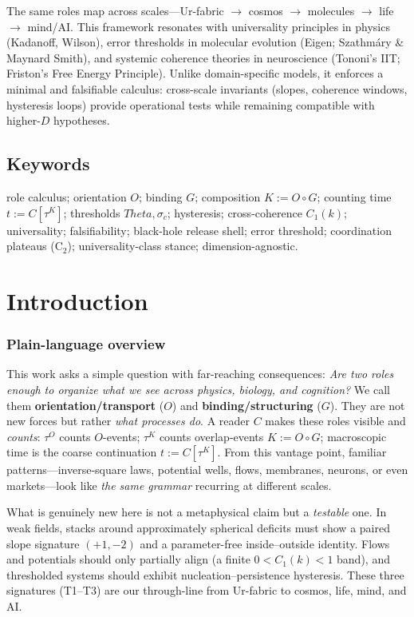 \documentclass[12pt,a4paper,oneside]{scrreprt}
\def\Theta{Theta}%
\begin{document}
The same roles map across scales—Ur-fabric $\rightarrow$ cosmos $\rightarrow$ 
molecules $\rightarrow$ life $\rightarrow$ mind/AI. This framework resonates with 
universality principles in physics (Kadanoff, Wilson), error thresholds in molecular 
evolution (Eigen; Szathmáry \& Maynard Smith), and systemic coherence theories 
in neuroscience (Tononi’s IIT; Friston’s Free Energy Principle). Unlike 
domain-specific models, it enforces a minimal and falsifiable calculus: 
cross-scale invariants (slopes, coherence windows, hysteresis loops) provide 
operational tests while remaining compatible with higher-$D$ hypotheses.

\chapter*{Keywords}
role calculus; orientation $O$; binding $G$; composition $K{:=}O\!\circ G$; 
counting time $t{:=}C[\tau^K]$; thresholds $\Theta,\sigma_c$; hysteresis; 
cross-coherence $C_1(k)$; universality; falsifiability; black-hole release shell; 
error threshold; coordination plateaus (C$_2$); universality-class stance; 
dimension-agnostic.

\tableofcontents
\listoffigures
\listoftables
\clearpage
{}

\part{Introduction}

\section*{Plain-language overview}
This work asks a simple question with far-reaching consequences: 
\emph{Are two roles enough to organize what we see across physics, biology, and cognition?} 
We call them \textbf{orientation/transport} ($O$) and \textbf{binding/structuring} ($G$). 
They are not new forces but rather \emph{what processes do}. 
A reader $C$ makes these roles visible and \emph{counts}: $\tau^O$ counts $O$-events; 
$\tau^K$ counts overlap-events $K := O \!\circ G$; macroscopic time is the coarse continuation $t := C[\tau^K]$. 
From this vantage point, familiar patterns---inverse-square laws, potential wells, flows, membranes, neurons, or even markets---look like \emph{the same grammar} recurring at different scales.

What is genuinely new here is not a metaphysical claim but a \emph{testable} one. 
In weak fields, stacks around approximately spherical deficits must show a paired slope signature $(+1,-2)$ and a parameter-free inside--outside identity. 
Flows and potentials should only partially align (a finite $0<C_1(k)<1$ band), and thresholded systems should exhibit nucleation--persistence hysteresis. 
These three signatures (T1--T3) are our through-line from Ur-fabric to cosmos, life, mind, and AI.
\end{document}
